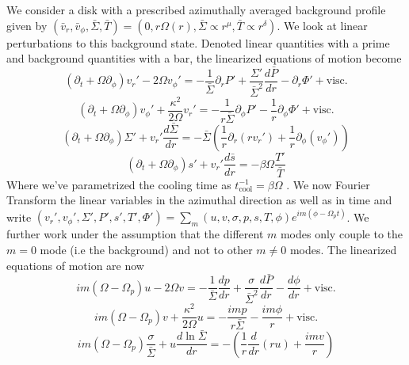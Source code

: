 \documentclass[apj]{emulateapj}
\begin{document}
We consider a disk with a prescribed azimuthally averaged background profile given by $(\bar{v}_r, \bar{v}_\phi, \bar{\Sigma}, \bar{T}) = ( 0, r \Omega(r), \bar{\Sigma} \propto r^\mu, \bar{T} \propto r^\delta) $. We look at linear perturbations to this background state. Denoted linear quantities with a prime and background quantities with a bar, the linearized equations of motion become
\begin{equation}
(\partial_t + \Omega \partial_\phi) v_r' - 2\Omega v_\phi' = - \frac{1}{\bar{\Sigma}} \partial_r P' + \frac{\Sigma'}{\bar{\Sigma}^2} \frac{d \bar{P}}{d r} - \partial_r \Phi' + \text{visc.}
\end{equation}
\begin{equation}
(\partial_t + \Omega \partial_\phi) v_\phi' + \frac{\kappa^2}{2\Omega} v_r' = - \frac{1}{r \bar{\Sigma}} \partial_\phi P'  -\frac{1}{r} \partial_\phi \Phi' + \text{visc.}
\end{equation}
\begin{equation}
(\partial_t + \Omega \partial_\phi)  \Sigma'  + v_r' \frac{ d \bar{\Sigma}}{d r }= - \bar{\Sigma} \left( \frac{1}{r} \partial_r ( r v_r') + \frac{1}{r} \partial_\phi(v_\phi' ) \right)
\end{equation}
\begin{equation}
(\partial_t + \Omega \partial_\phi)  s' +  v_r' \frac{d \bar{s}}{d r}  = - \beta \Omega \frac{T'}{\bar{T}}
\end{equation}
Where we've parametrized the cooling time as $t_\text{cool}^{-1} = \beta \Omega $ \citep{gam01}. We now Fourier Transform the linear variables in the azimuthal direction as well as in time and write $(v_r',v_\phi',\Sigma', P', s', T' , \Phi') = \sum_m  (u,v,\sigma,p,s,T,\phi) e^{ i  m(\phi -  \Omega_p t) } $. We further work under the assumption that the different $m$ modes only couple to the $m=0$ mode (i.e the background) and not to other $m \neq 0$ modes. The linearized equations of motion are now
\begin{equation}
i m (\Omega - \Omega_p) u - 2 \Omega v  = - \frac{1}{\bar{\Sigma}} \frac{d p}{d r} + \frac{\sigma}{\bar{\Sigma}^2} \frac{d \bar{P}}{d r} - \frac{ d \phi}{d r} + \text{visc.}
\end{equation}
 \begin{equation}
i m (\Omega - \Omega_p) v + \frac{\kappa^2}{2 \Omega} u  = - \frac{i m p}{r \bar{\Sigma}}  - \frac{ i m \phi}{ r} + \text{visc.}
\end{equation}
\begin{equation}  \label{eq:dtsigma}
i m (\Omega - \Omega_p) \frac{ \sigma }{ \bar{\Sigma}}+ u \frac{d \ln \bar{\Sigma}}{d r} = - \left( \frac{1}{r} \frac{d }{d r} ( r u) + \frac{ i m v}{r } \right)
\end{equation}
\end{document}
